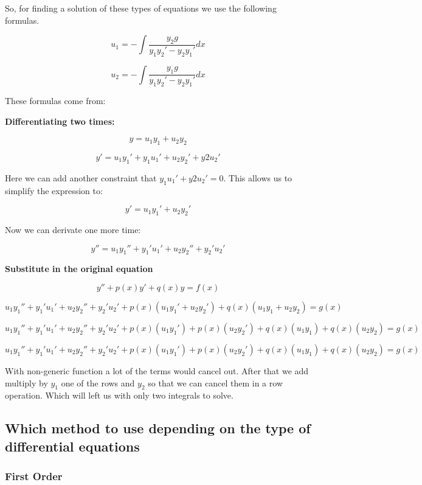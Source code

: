So, for finding a solution of these types of equations we use the following formulas.

\[
u_1 = - \int \frac{y_2 g}{y_1 y_{2}' - y_2 y_{1}'} dx
\]


\[
u_2 = - \int \frac{y_1 g}{y_1 y_{2}' - y_2 y_{1}'} dx
\]

These formulas come from:
\vspace{\baselineskip}

\textbf{Differentiating two times:}

\[
y = u_1 y_1 + u_2 y_2
\]

\[
y' = u_1 y_{1}' + y_1 u_{1}' +  u_2 y_{2}' + y{2} u_{2}'
\]

Here we can add another constraint that \(y_1 u_{1}' + y{2} u_{2}' = 0\). This allows us to
simplify the expression to:

\[
y' = u_1 y_{1}' +  u_2 y_{2}'
\]

Now we can derivate one more time:

\[
y'' =  u_1 y_{1}'' + y_{1}' u_{1}'  + u_2 y_{2}'' + y_{2}' u_{2}'
\]


\textbf{Substitute in the original equation}

\[
y'' + p(x)y' + q(x)y = f(x)
\]

\[
 u_1 y_{1}'' + y_{1}' u_{1}'  + u_2 y_{2}'' + y_{2}' u_{2}' + p(x)(u_1 y_{1}' +  u_2 y_{2}') + q(x)(u_1 y_1 + u_2 y_2) = g(x)  
\]

\[
 u_1 y_{1}'' + y_{1}' u_{1}'  + u_2 y_{2}'' + y_{2}' u_{2}' + p(x)(u_1 y_{1}') + p(x)(u_2 y_{2}') + q(x)(u_1 y_1) + q(x)(u_2 y_2) = g(x)  
\]

\[
 u_1 y_{1}'' + y_{1}' u_{1}'  + u_2 y_{2}'' + y_{2}' u_{2}' + p(x)(u_1 y_{1}') + p(x)(u_2 y_{2}') + q(x)(u_1 y_1) + q(x)(u_2 y_2) = g(x)  
\]

With non-generic function a lot of the terms would cancel out. After that we add multiply by
\(y_1\) one of the rows and \(y_2\) so that we can cancel them in a row operation. Which will left us
with only two integrals to solve.

\subsection{Which method to use depending on the type of differential equations}

\subsubsection{First Order}

